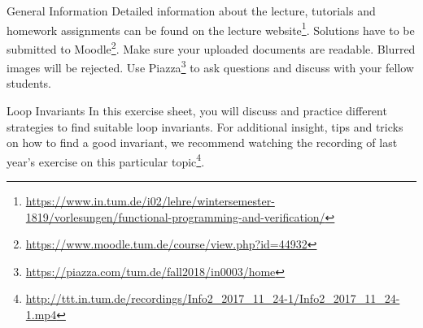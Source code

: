 \documentclass[
  english
]{tumteaching}
\begin{document}
\verticalline
\begin{disclaimer}{General Information}
	Detailed information about the lecture, tutorials and homework assignments can be found on the lecture website\footnote{\url{https://www.in.tum.de/i02/lehre/wintersemester-1819/vorlesungen/functional-programming-and-verification/}}. Solutions have to be submitted to Moodle\footnote{\url{https://www.moodle.tum.de/course/view.php?id=44932}}. Make sure your uploaded documents are readable. Blurred images will be rejected. Use Piazza\footnote{\url{https://piazza.com/tum.de/fall2018/in0003/home}} to ask questions and discuss with your fellow students.
\end{disclaimer}

\verticalline

\begin{disclaimer}{Loop Invariants}
	In this exercise sheet, you will discuss and practice different strategies to find suitable loop invariants. For additional insight, tips and tricks on how to find a good invariant, we recommend watching the recording of last year's exercise on this particular topic\footnote{\url{http://ttt.in.tum.de/recordings/Info2_2017_11_24-1/Info2_2017_11_24-1.mp4}}.
\end{disclaimer}

\verticalline
\end{document}
